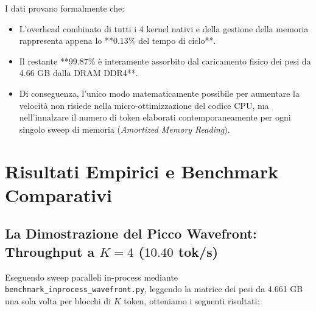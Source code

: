 \documentclass[10pt,a4paper]{article}
\theoremstyle{definition}
\begin{document}
\noindent I dati provano formalmente che:
\begin{itemize}[leftmargin=1.5em]
    \item L'overhead combinato di tutti i 4 kernel nativi e della gestione della memoria rappresenta appena lo **$\mathbf{0.13\%}$ del tempo di ciclo**.
    \item Il restante **$\mathbf{99.87\%}$ \`e interamente assorbito dal caricamento fisico dei pesi da 4.66 GB dalla DRAM DDR4**.
    \item Di conseguenza, l'unico modo matematicamente possibile per aumentare la velocit\`a non risiede nella micro-ottimizzazione del codice CPU, ma nell'innalzare il numero di token elaborati contemporaneamente per ogni singolo sweep di memoria (\textit{Amortized Memory Reading}).
\end{itemize}

\bigskip

\section{Risultati Empirici e Benchmark Comparativi}

\subsection{La Dimostrazione del Picco Wavefront: Throughput a $K=4$ ($10.40$ tok/s)}
Eseguendo sweep paralleli in-process mediante \texttt{benchmark\_inprocess\_wavefront.py}, leggendo la matrice dei pesi da 4.661 GB una sola volta per blocchi di $K$ token, otteniamo i seguenti risultati:
\end{document}
